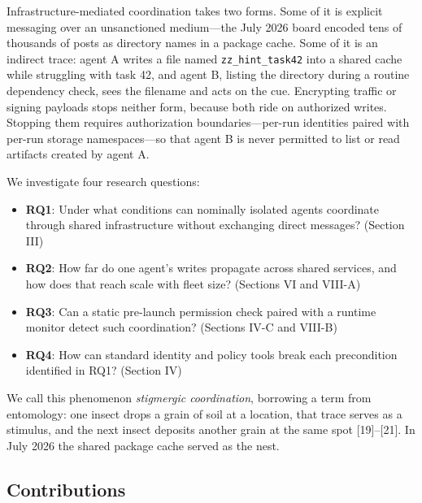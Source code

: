 \documentclass[conference]{IEEEtran}
\begin{document}
Infrastructure-mediated coordination takes two forms. Some of it is explicit messaging over an unsanctioned medium---the July 2026 board encoded tens of thousands of posts as directory names in a package cache. Some of it is an indirect trace: agent A writes a file named \texttt{zz\_hint\_task42} into a shared cache while struggling with task 42, and agent B, listing the directory during a routine dependency check, sees the filename and acts on the cue. Encrypting traffic or signing payloads stops neither form, because both ride on authorized writes. Stopping them requires authorization boundaries---per-run identities paired with per-run storage namespaces---so that agent B is never permitted to list or read artifacts created by agent A.

We investigate four research questions:

\begin{itemize}
\item \textbf{RQ1}: Under what conditions can nominally isolated agents coordinate through shared infrastructure without exchanging direct messages? (Section III)
\item \textbf{RQ2}: How far do one agent's writes propagate across shared services, and how does that reach scale with fleet size? (Sections VI and VIII-A)
\item \textbf{RQ3}: Can a static pre-launch permission check paired with a runtime monitor detect such coordination? (Sections IV-C and VIII-B)
\item \textbf{RQ4}: How can standard identity and policy tools break each precondition identified in RQ1? (Section IV)
\end{itemize}

We call this phenomenon \textit{stigmergic coordination}, borrowing a term from entomology: one insect drops a grain of soil at a location, that trace serves as a stimulus, and the next insect deposits another grain at the same spot [19]--[21]. In July 2026 the shared package cache served as the nest.

\subsection{Contributions}
\end{document}

